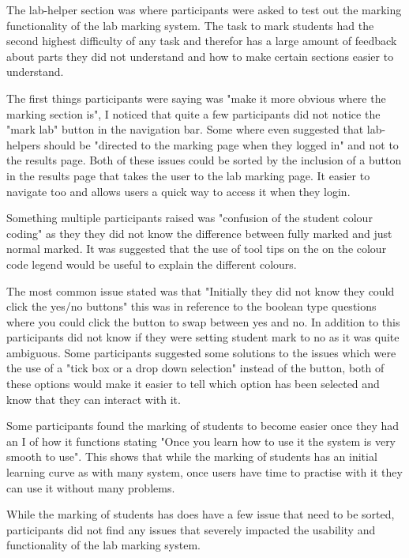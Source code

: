 \documentclass[12pt]{article}  %
\begin{document}
The lab-helper section was where participants were asked to test out the marking functionality of the lab marking system. The task to mark students had the second highest difficulty of any task and therefor has a large amount of feedback about parts they did not understand and how to make certain sections easier to understand. 

The first things participants were saying was "make it more obvious where the marking section is", I noticed that quite a few participants did not notice the "mark lab" button in the navigation bar. Some where even suggested that lab-helpers should be "directed to the marking page when they logged in" and not to the results page. Both of these issues could be sorted by the inclusion of a button in the results page that takes the user to the lab marking page. It easier to navigate too and allows users a quick way to access it when they login. 

Something multiple participants raised was "confusion of the student colour coding" as they they did not know the difference between fully marked and just normal marked. It was suggested that the use of tool tips on the on the colour code legend would be useful to explain the different colours. 

The most common issue stated was that "Initially they did not know they could click the yes/no buttons" this was in reference to the boolean type questions where you could click the button to swap between yes and no. In addition to this participants did not know if they were setting student mark to no as it was quite ambiguous. Some participants suggested some solutions to the issues which were the use of a "tick box or a drop down selection" instead of the button, both of these options would make it easier to tell which option has been selected and know that they can interact with it.

Some participants found the marking of students to become easier once they had an I of how it functions stating "Once you learn how to use it the system is very smooth to use". This shows that while the marking of students has an initial learning curve as with many system, once users have time to practise with it they can use it without many problems.

While the marking of students has does have a few issue that need to be sorted, participants did not find any issues that severely impacted the usability and functionality of the lab marking system.
\end{document}
